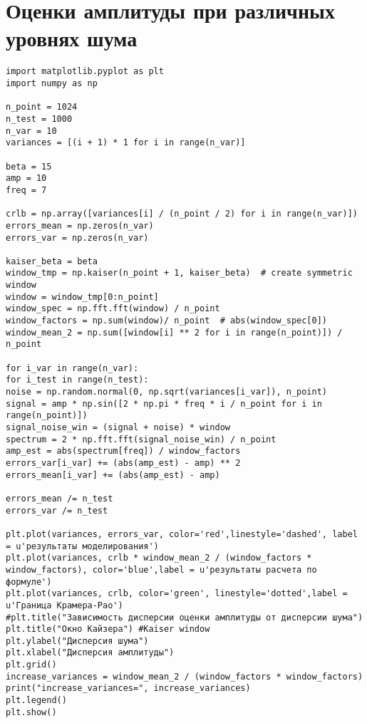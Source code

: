 \chapter{Оценки амплитуды при различных уровнях шума}\label{app:Е}
\begin{verbatim}
import matplotlib.pyplot as plt
import numpy as np

n_point = 1024
n_test = 1000
n_var = 10
variances = [(i + 1) * 1 for i in range(n_var)]

beta = 15
amp = 10
freq = 7

crlb = np.array([variances[i] / (n_point / 2) for i in range(n_var)])
errors_mean = np.zeros(n_var)
errors_var = np.zeros(n_var)

kaiser_beta = beta
window_tmp = np.kaiser(n_point + 1, kaiser_beta)  # create symmetric window
window = window_tmp[0:n_point]
window_spec = np.fft.fft(window) / n_point
window_factors = np.sum(window)/ n_point  # abs(window_spec[0])
window_mean_2 = np.sum([window[i] ** 2 for i in range(n_point)]) / n_point

for i_var in range(n_var):
for i_test in range(n_test):
noise = np.random.normal(0, np.sqrt(variances[i_var]), n_point)
signal = amp * np.sin([2 * np.pi * freq * i / n_point for i in range(n_point)])
signal_noise_win = (signal + noise) * window
spectrum = 2 * np.fft.fft(signal_noise_win) / n_point
amp_est = abs(spectrum[freq]) / window_factors
errors_var[i_var] += (abs(amp_est) - amp) ** 2
errors_mean[i_var] += (abs(amp_est) - amp)

errors_mean /= n_test
errors_var /= n_test

plt.plot(variances, errors_var, color='red',linestyle='dashed', label = u'результаты моделирования')
plt.plot(variances, crlb * window_mean_2 / (window_factors * window_factors), color='blue',label = u'результаты расчета по формуле')
plt.plot(variances, crlb, color='green', linestyle='dotted',label = u'Граница Крамера-Рао')
#plt.title("Зависимость дисперсии оценки амплитуды от дисперсии шума")
plt.title("Окно Кайзера") #Kaiser window
plt.ylabel("Дисперсия шума")
plt.xlabel("Дисперсия амплитуды")
plt.grid()
increase_variances = window_mean_2 / (window_factors * window_factors)
print("increase_variances=", increase_variances)
plt.legend()
plt.show()	
\end{verbatim}


